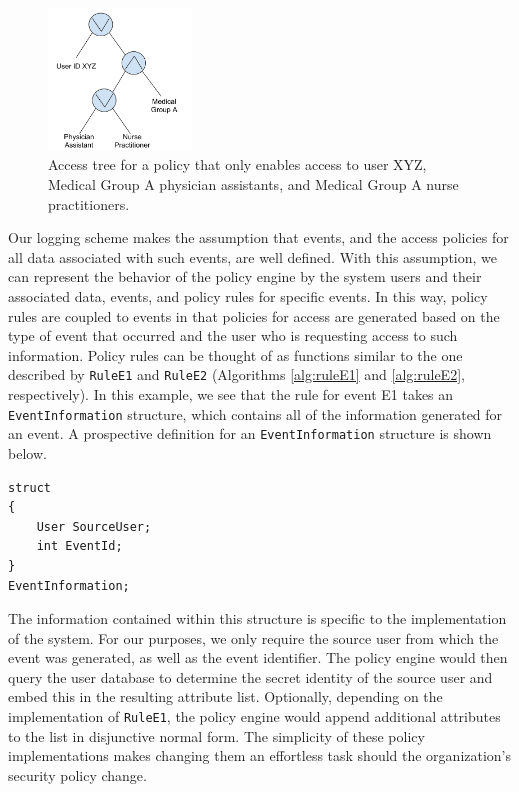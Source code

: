 \documentclass{sig-alternate}
\begin{document}
\begin{figure}[ht!]
\begin{center}
\includegraphics[width=1.5in]{images/cpabePolicy.pdf}
\caption{Access tree for a policy that only enables access to user XYZ, Medical Group A physician assistants, and Medical Group A nurse practitioners.}
\label{fig:accessTree}
\end{center}
\end{figure}

Our logging scheme makes the assumption that events, and the access policies for all data associated
with such events, are well defined. With this
assumption, we can represent the behavior of the policy engine by the system users and their associated
data, events, and policy rules for specific events. In this way, policy rules are coupled to events in that 
policies for access are generated based on the type of event that occurred and the user who is requesting 
access to such information. Policy rules can be thought of as functions similar to the one described by 
{\tt RuleE1} and {\tt RuleE2} (Algorithms \ref{alg:ruleE1} and \ref{alg:ruleE2}, respectively).
In this example, we see that the rule for event E1 
takes an {\tt EventInformation} structure, which contains
all of the information generated for an event. A prospective definition for an {\tt EventInformation} structure
is shown below.
\begin{lstlisting}
struct 
{
    User SourceUser;
    int EventId;
} 
EventInformation;
\end{lstlisting} 

The information contained within this structure is specific 
to the implementation of the system. For our purposes, we only require the source user from which the
event was generated, as well as the event identifier. The policy engine would then query the user
database to determine the secret identity of the source user and embed this in the resulting attribute
list. Optionally, depending on the implementation of {\tt RuleE1}, the policy engine would append additional
attributes to the list in disjunctive normal form. The simplicity of these policy implementations 
makes changing them an effortless task should the organization's security policy change.
\end{document}
